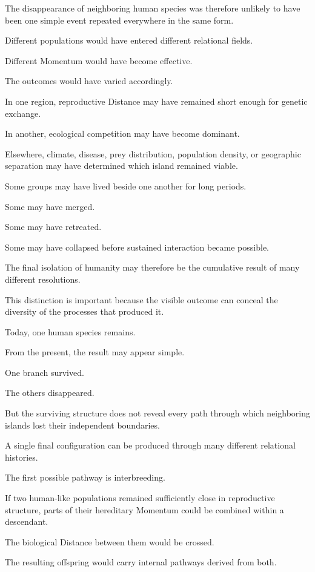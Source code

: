 The disappearance of neighboring human species was therefore unlikely to have been one simple event repeated everywhere in the same form.

Different populations would have entered different relational fields.

Different Momentum would have become effective.

The outcomes would have varied accordingly.

In one region, reproductive Distance may have remained short enough for genetic exchange.

In another, ecological competition may have become dominant.

Elsewhere, climate, disease, prey distribution, population density, or geographic separation may have determined which island remained viable.

Some groups may have lived beside one another for long periods.

Some may have merged.

Some may have retreated.

Some may have collapsed before sustained interaction became possible.

The final isolation of humanity may therefore be the cumulative result of many different resolutions.

This distinction is important because the visible outcome can conceal the diversity of the processes that produced it.

Today, one human species remains.

From the present, the result may appear simple.

One branch survived.

The others disappeared.

But the surviving structure does not reveal every path through which neighboring islands lost their independent boundaries.

A single final configuration can be produced through many different relational histories.

The first possible pathway is interbreeding.

If two human-like populations remained sufficiently close in reproductive structure, parts of their hereditary Momentum could be combined within a descendant.

The biological Distance between them would be crossed.

The resulting offspring would carry internal pathways derived from both.


